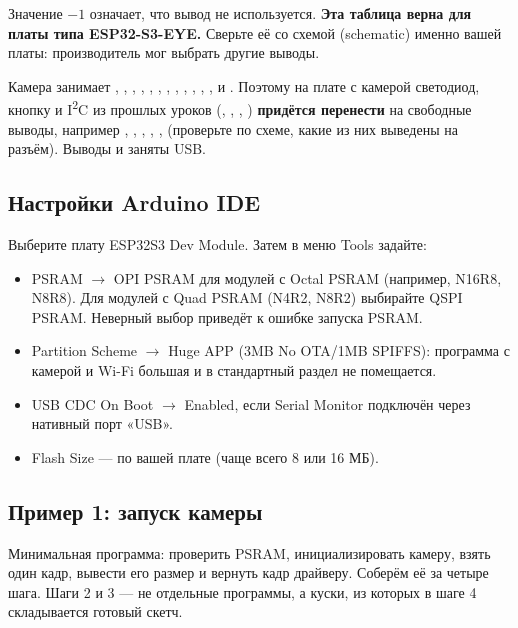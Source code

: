 Значение $-1$ означает, что вывод не используется. \textbf{Эта таблица верна для платы типа ESP32-S3-EYE.}
Сверьте её со схемой (schematic) именно вашей платы: производитель мог выбрать другие выводы.

\begin{caution}
Камера занимает , , , , , , , , , , , , 
и . Поэтому на плате с камерой светодиод, кнопку и I\textsuperscript{2}C из прошлых уроков (, ,
, ) \textbf{придётся перенести} на свободные выводы, например , , , , , 
(проверьте по схеме, какие из них выведены на разъём). Выводы  и  заняты USB.
\end{caution}

\subsection{Настройки Arduino IDE}

Выберите плату \textsf{ESP32S3 Dev Module}. Затем в меню \textsf{Tools} задайте:
\begin{itemize}[leftmargin=*]
  \item \textsf{PSRAM} $\to$ \textsf{OPI PSRAM} для модулей с Octal PSRAM (например, N16R8, N8R8). Для модулей с
        Quad PSRAM (N4R2, N8R2) выбирайте \textsf{QSPI PSRAM}. Неверный выбор приведёт к ошибке запуска PSRAM.
  \item \textsf{Partition Scheme} $\to$ \textsf{Huge APP (3MB No OTA/1MB SPIFFS)}: программа с камерой и Wi-Fi
        большая и в стандартный раздел не помещается.
  \item \textsf{USB CDC On Boot} $\to$ \textsf{Enabled}, если Serial Monitor подключён через нативный порт «USB».
  \item \textsf{Flash Size} --- по вашей плате (чаще всего 8 или 16 МБ).
\end{itemize}

\subsection{Пример 1: запуск камеры}

Минимальная программа: проверить PSRAM, инициализировать камеру, взять один кадр, вывести его размер и
вернуть кадр драйверу. Соберём её за четыре шага. Шаги 2 и 3 --- не отдельные программы, а куски, из которых
в шаге 4 складывается готовый скетч.

